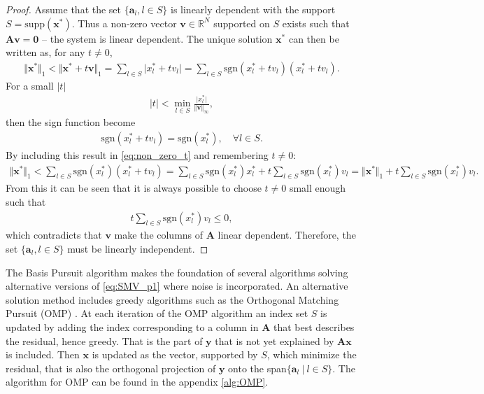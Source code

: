 \begin{proof}
Assume that the set $\lbrace \mathbf{a}_l, l \in S \rbrace$ is linearly dependent with the support $S = \text{supp}(\mathbf{x}^\ast)$.
Thus a non-zero vector $\mathbf{v} \in \mathbb{R}^N$ supported on $S$ exists such that $\mathbf{Av} = \textbf{0}$ -- the system is linear dependent. The unique solution $\mathbf{x}^\ast$ can then be written as, for any $t \neq 0$,
\begin{align}\label{eq:non_zero_t}
\Vert \mathbf{x}^\ast \Vert_1 < \Vert \mathbf{x}^\ast + t \mathbf{v} \Vert_1 = \sum_{l \in S} \vert x_l^\ast + t v_l \vert = \sum_{l \in S} \text{sgn}(x_l^\ast + t v_l )(x_l^\ast + t v_l ).
\end{align}
For a small $|t|$
\begin{align*}
|t| < \min_{l \in S} \frac{\vert x_l^\ast \vert}{\Vert \mathbf{v} \Vert_{\infty}},
\end{align*}
then the sign function become
\begin{align*}
\text{sgn}(x_l^\ast + t v_l) = \text{sgn}(x_l^\ast), \quad \forall l \in S.
\end{align*}
By including this result in \eqref{eq:non_zero_t} and remembering $t \neq 0$:
\begin{align*}
\Vert \textbf{x}^{\ast} \Vert_1 < \sum_{l \in S} \text{sgn}(x_l^{\ast})(x_l^{\ast} + t v_l ) = \sum_{l \in S} \text{sgn}(x_l^{\ast})x_l^{\ast} + t \sum_{l \in S} \text{sgn}(x_l^{\ast})v_l = \Vert \textbf{x}^{\ast} \Vert_1 + t \sum_{l \in S} \text{sgn}(x_l^{\ast})v_l.
\end{align*}
From this it can be seen that it is always possible to choose $t \neq 0$ small enough such that 
\begin{align*}
t \sum_{l \in S} \text{sgn}(x_l^\ast)v_l \leq 0,
\end{align*}
which contradicts that $\mathbf{v}$ make the columns of $\mathbf{A}$ linear dependent. 
Therefore, the set $\lbrace \mathbf{a}_l, l \in S \rbrace$ must be linearly independent.
\end{proof}



The Basis Pursuit algorithm makes the foundation of several algorithms solving alternative versions of \eqref{eq:SMV_p1} where noise is incorporated. 
An alternative solution method includes greedy algorithms such as the Orthogonal Matching Pursuit (OMP) \cite[P. 65]{FR}. 
At each iteration of the OMP algorithm an index set $S$ is updated by adding the index corresponding to a column in $\mathbf{A}$ that best describes the residual, hence greedy.
That is the part of $\mathbf{y}$ that is not yet explained by $\mathbf{Ax}$ is included. 
Then $\mathbf{x}$ is updated as the vector, supported by $S$, which minimize the residual, that is also the orthogonal projection of $\mathbf{y}$ onto the span$\lbrace \mathbf{a}_l \ \vert \ l \in S \rbrace$. The algorithm for OMP can be found in the appendix \ref{alg:OMP}.


